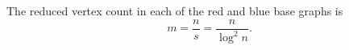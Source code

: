 \begin{definition}
The reduced vertex count in each of the red and blue base graphs is
\[
m=\frac{n}{s}=\frac{n}{\log^2 n}.
\]
\end{definition}
